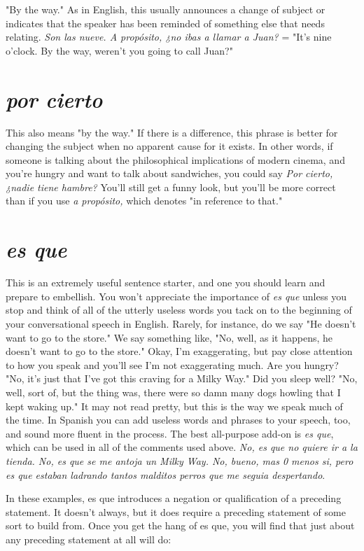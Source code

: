 "By the way." As in English, this usually announces a change
of subject or indicates that the speaker has been reminded of something else that needs relating. \emph{Son las nueve. A propósito, ¿no ibas a
llamar a Juan?} = "It's nine o'clock. By the way, weren't you going to
call Juan?"

\section{\emph{por cierto}}

This also means "by the way." If there is a difference, this
phrase is better for changing the subject when no apparent cause for
it exists. In other words, if someone is talking about the philosophical
implications of modern cinema, and you're hungry and want to talk
about sandwiches, you could say \emph{Por cierto, ¿nadie tiene hambre?}
You'll still get a funny look, but you'll be more correct than if you use
\emph{a propósito,} which denotes "in reference to that."

\section{\emph{es que}}

This is an extremely useful sentence starter, and one you
should learn and prepare to embellish. You won't appreciate the importance of \emph{es que} unless you stop and think of all of the utterly useless
words you tack on to the beginning of your conversational speech in
English. Rarely, for instance, do we say "He doesn't want to go to the
store." We say something like, "No, well, as it happens, he doesn't
want to go to the store." Okay, I'm exaggerating, but pay close attention to how you speak and you'll see I'm not exaggerating much. Are
you hungry? "No, it's just that I've got this craving for a Milky Way."
Did you sleep well? "No, well, sort of, but the thing was, there were
so damn many dogs howling that I kept waking up." It may not read
pretty, but this is the way we speak much of the time. In Spanish you
can add useless words and phrases to your speech, too, and sound more
fluent in the process. The best all-purpose add-on is \emph{es que}, which can
be used in all of the comments used above. \emph{No, es que no quiere ir a
la tienda. No, es que se me antoja un Milky Way. No, bueno, mas 0
menos si, pero es que estaban ladrando tantos malditos perros que
me seguia despertando}.

In these examples, es que introduces a negation or qualification of a preceding statement. It doesn't always, but it does require a preceding statement of some sort to build from. Once you get the hang of es
que, you will find that just about any preceding statement at all will do:


